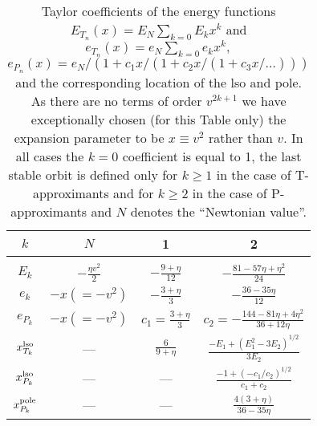 \begin {table}[h]
\caption {Taylor coefficients of the energy functions
$E_{T_n}(x) = E_N \sum_{k=0} E_k x^k$ and $e_{T_n}(x) = e_N \sum_{k=0} e_k x^k,$
$e_{P_n}(x) = e_N/(1+c_1x/(1 + c_2x / (1 + c_3x/ \ldots )))$ and the corresponding
 location of the lso and pole.
As there are no terms of order $v^{2k+1}$ we have exceptionally chosen
(for this Table only) the expansion
parameter to be $x\equiv v^2$ rather than $v.$ In all cases the
 $k=0$ coefficient
is equal to 1, the last stable orbit is defined only for $k\ge 1$ in the
case of T-approximants and for $k\ge 2$ in the case of P-approximants
and $N$ denotes the ``Newtonian value''.}
\begin {center}
\begin {tabular}{c c c c}
\hline
$k$    & $N$ & 1  & 2 \\[3pt]
\hline\\[-8pt]
$E_k$
     & $-\frac{\eta v^2}{2}$
     & $-\frac{9+\eta}{12}$
     & $-\frac{81-57\eta+\eta^2}{24}$\\[3pt]
$e_k$
      & $-x(=-v^2)$
      & $-\frac{3+\eta}{3}$
      & $-\frac{36-35\eta}{12}$\\[3pt]
$e_{P_k}$
      & $-x(=-v^2)$
      & $c_1=\frac{3+\eta}{3}$
      & $c_2=-\frac{144-81\eta+4 \eta^2}{36+12\eta}$\\[3pt]
$x^{\rm lso}_{T_k}$
      & ---
      & $\frac{6}{9+\eta}$
      & $\frac {-E_1 + (E_1^2-3E_2)^{1/2}}{3E_2} $\\[3pt]
$x^{\rm lso}_{P_k}$
      & ---
      & ---
      & $\frac{-1 + (-c_1/c_2)^{1/2}}{c_1+c_2}$ \\[3pt]
$x^{\rm pole}_{P_k}$
      & ---
      & ---
      & $\frac{4(3+\eta)}{36-35\eta}$\\[3pt]
\hline
\end {tabular}
\end {center}
\label{table:energy}
\end {table}


